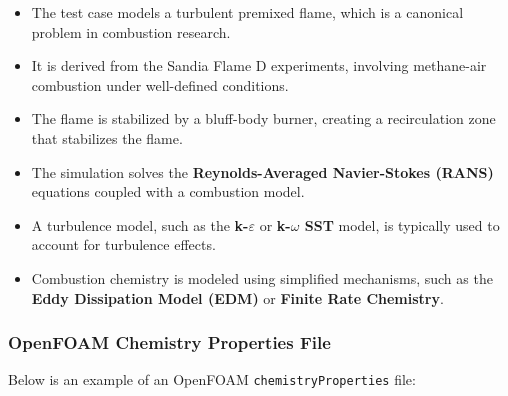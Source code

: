 \begin{itemize}
    \item The test case models a turbulent premixed flame, which is a canonical problem in combustion research.
    \item It is derived from the Sandia Flame D experiments, involving methane-air combustion under well-defined conditions.
    \item The flame is stabilized by a bluff-body burner, creating a recirculation zone that stabilizes the flame.
\end{itemize}

\begin{itemize}
    \item The simulation solves the \textbf{Reynolds-Averaged Navier-Stokes (RANS)} equations coupled with a combustion model.
    \item A turbulence model, such as the \textbf{k-$\varepsilon$} or \textbf{k-$\omega$ SST} model, is typically used to account for turbulence effects.
    \item Combustion chemistry is modeled using simplified mechanisms, such as the \textbf{Eddy Dissipation Model (EDM)} or \textbf{Finite Rate Chemistry}.
\end{itemize}

\subsubsection*{OpenFOAM Chemistry Properties File}

Below is an example of an OpenFOAM \texttt{chemistryProperties} file:

